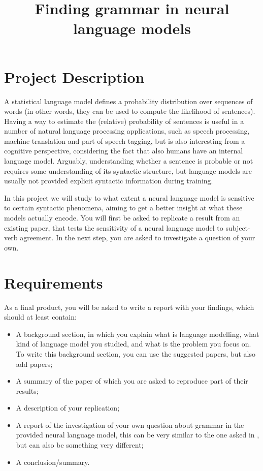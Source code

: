 \documentclass{article}
\title{Finding grammar in neural language models}
\date{}
\begin{document}
\maketitle

\section*{Project Description}

A statistical language model defines a probability distribution over sequences of words (in other words, they can be used to compute the likelihood of sentences).
Having a way to estimate the (relative) probability of sentences is useful in a number of natural language processing applications, such as speech processing, machine translation and part of speech tagging, but is also interesting from a cognitive perspective, considering the fact that also humans have an internal language model.
Arguably, understanding whether a sentence is probable or not requires some understanding of its syntactic structure, but language models are usually not provided explicit syntactic information during training.

In this project we will study to what extent a neural language model is sensitive to certain syntactic phenomena, aiming to get a better insight at what these models actually encode.
You will first be asked to replicate a result from an existing paper, that tests the sensitivity of a neural language model to subject-verb agreement.
In the next step, you are asked to investigate a question of your own.

\section*{Requirements}
As a final product, you will be asked to write a report with your findings, which should at least contain:\begin{itemize}
	\item A background section, in which you explain what is language modelling, what kind of language model you studied, and what is the problem you focus on. To write this background section, you can use the suggested papers, but also add papers;
    \item A summary of \cite{linzen2016assessing} the paper of which you are asked to reproduce part of their results;
    \item A description of your replication;
    \item A report of the investigation of your own question about grammar in the provided neural language model, this can be very similar to the one asked in \cite{linzen2016assessing}, but can also be something very different;
    \item A conclusion/summary.
\end{itemize}
\end{document}
